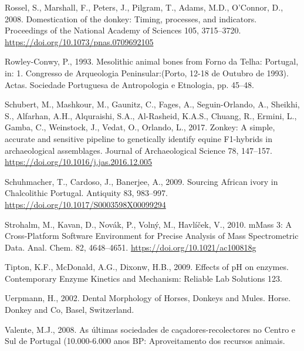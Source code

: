 \documentclass[preprint, 3p, authoryear]{elsarticle} %
\newlength{\cslhangindent}
\newlength{\cslentryspacingunit} %
\newenvironment{CSLReferences}[2] %
 {%
  \setlength{\parindent}{0pt}
  \ifodd #1
  \let\oldpar\par
  \def\par{\hangindent=\cslhangindent\oldpar}
  \fi
  \setlength{\parskip}{#2\cslentryspacingunit}
 }%
 {}
\begin{document}
\begin{CSLReferences}{1}{0}
\leavevmode{}%
Rossel, S., Marshall, F., Peters, J., Pilgram, T., Adams, M.D., O'Connor, D., 2008. Domestication of the donkey: {Timing}, processes, and indicators. Proceedings of the National Academy of Sciences 105, 3715--3720. \url{https://doi.org/10.1073/pnas.0709692105}

\leavevmode{}%
Rowley-Conwy, P., 1993. Mesolithic animal bones from {Forno} da {Telha}: {Portugal}, in: 1. {Congresso} de {Arqueologia Peninsular}:({Porto}, 12-18 de {Outubro} de 1993). {Actas}. {Sociedade Portuguesa de Antropologia e Etnologia}, pp. 45--48.

\leavevmode{}%
Schubert, M., Mashkour, M., Gaunitz, C., Fages, A., Seguin-Orlando, A., Sheikhi, S., Alfarhan, A.H., Alquraishi, S.A., Al-Rasheid, K.A.S., Chuang, R., Ermini, L., Gamba, C., Weinstock, J., Vedat, O., Orlando, L., 2017. Zonkey: {A} simple, accurate and sensitive pipeline to genetically identify equine {F1-hybrids} in archaeological assemblages. Journal of Archaeological Science 78, 147--157. \url{https://doi.org/10.1016/j.jas.2016.12.005}

\leavevmode{}%
Schuhmacher, T., Cardoso, J., Banerjee, A., 2009. Sourcing {African} ivory in {Chalcolithic Portugal}. Antiquity 83, 983--997. \url{https://doi.org/10.1017/S0003598X00099294}

\leavevmode{}%
Strohalm, M., Kavan, D., Novák, P., Volný, M., Havlíček, V., 2010. {mMass} 3: {A Cross-Platform Software Environment} for {Precise Analysis} of {Mass Spectrometric Data}. Anal. Chem. 82, 4648--4651. \url{https://doi.org/10.1021/ac100818g}

\leavevmode{}%
Tipton, K.F., McDonald, A.G., Dixonw, H.B., 2009. Effects of {pH} on enzymes. Contemporary Enzyme Kinetics and Mechanism: Reliable Lab Solutions 123.

\leavevmode{}%
Uerpmann, H., 2002. Dental {Morphology} of {Horses}, {Donkeys} and {Mules}. Horse. Donkey and Co, Basel, Switzerland.

\leavevmode{}%
Valente, M.J., 2008. As últimas sociedades de caçadores-recolectores no {Centro} e {Sul} de {Portugal} (10.000-6.000 anos {BP}: Aproveitamento dos recursos animais.


\end{CSLReferences}
\end{document}

